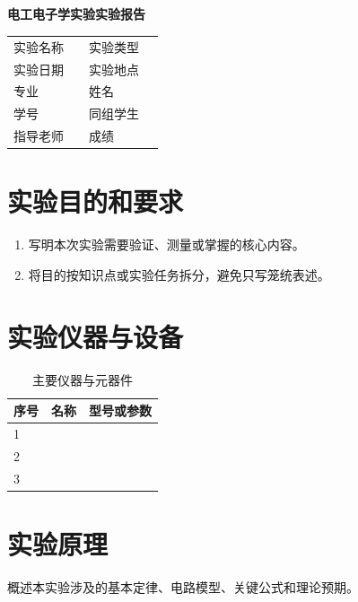 \documentclass[10.5pt,a4paper]{ctexart}
\title{\reportCourse\\\reportTitle}
\author{}
\date{}
\newcommand{\reportCourse}{电工电子学实验}
\newcommand{\reportTitle}{实验报告}
\newcommand{\experimentName}{}
\newcommand{\experimentType}{}
\newcommand{\experimentDate}{}
\newcommand{\experimentPlace}{}
\newcommand{\studentMajor}{}
\newcommand{\studentName}{}
\newcommand{\studentId}{}
\newcommand{\partnerName}{}
\newcommand{\instructorName}{}
\newcommand{\score}{}
\begin{document}
\begin{center}
  {\bfseries \reportCourse\quad \reportTitle}
\end{center}

\begin{table}[H]
  \centering
  \renewcommand{\arraystretch}{1.45}
  \begin{tabular}{L{2.2cm}L{5.0cm}L{2.2cm}L{5.0cm}}
    实验名称 & \experimentName & 实验类型 & \experimentType \\
    实验日期 & \experimentDate & 实验地点 & \experimentPlace \\
    专业 & \studentMajor & 姓名 & \studentName \\
    学号 & \studentId & 同组学生 & \partnerName \\
    指导老师 & \instructorName & 成绩 & \score \\
  \end{tabular}
\end{table}

\section{实验目的和要求}
\begin{enumerate}
  \item 写明本次实验需要验证、测量或掌握的核心内容。
  \item 将目的按知识点或实验任务拆分，避免只写笼统表述。
\end{enumerate}

\section{实验仪器与设备}
\begin{table}[H]
  \centering
  \caption{主要仪器与元器件}
  \begin{tabular}{C{1.2cm}L{6.0cm}L{5.0cm}}
    \toprule
    序号 & 名称 & 型号或参数 \\
     &  &  \\
    2 &  &  \\
    3 &  &  \\
    \bottomrule
  \end{tabular}
\end{table}

\section{实验原理}
概述本实验涉及的基本定律、电路模型、关键公式和理论预期。
\end{document}
